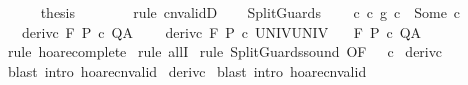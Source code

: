 \begin{isabellebody}
\ \ \ \ \isamarkupfalse%
\ {\isacharquery}thesis\isanewline
\ \ \ \ \ \ \isamarkupfalse%
\ {\isacharparenleft}rule\ cnvalidD{\isacharparenright}\isanewline
\ \ \isamarkupfalse%
\isanewline
{}\isamarkupfalse%
%
\endisatagproof
{\isafoldproof}%
%
\isadelimproof
\isanewline
%
\endisadelimproof
\isanewline
{}\isamarkupfalse%
\ SplitGuards{\isacharcolon}\ \isanewline
\ \ \ c{\isacharcolon}\ {\isachardoublequoteopen}{\isacharparenleft}c\ {\isasyminter}\isactrlsub g\ c\ {\isacharequal}\ Some\ c{\isachardoublequoteclose}\ \isanewline
\ \ \ deriv{\isacharunderscore}c{}{\isacharcolon}\ {\isachardoublequoteopen}{\isasymGamma}{\isacharcomma}{\isasymTheta}{\isasymturnstile}\isactrlbsub {\isacharslash}F\isactrlesub \ P\ c\ Q{\isacharcomma}A{\isachardoublequoteclose}\ \isanewline
\ \ \ deriv{\isacharunderscore}c{}{\isacharcolon}\ {\isachardoublequoteopen}{\isasymGamma}{\isacharcomma}{\isasymTheta}{\isasymturnstile}\isactrlbsub {\isacharslash}F\isactrlesub \ P\ c\ UNIV{\isacharcomma}UNIV{\isachardoublequoteclose}\isanewline
\ \ \ {\isachardoublequoteopen}{\isasymGamma}{\isacharcomma}{\isasymTheta}{\isasymturnstile}\isactrlbsub {\isacharslash}F\isactrlesub \ P\ c\ Q{\isacharcomma}A{\isachardoublequoteclose}\isanewline
%
\isadelimproof
%
\endisadelimproof
%
\isatagproof
{}\isamarkupfalse%
\ {\isacharparenleft}rule\ hoare{\isacharunderscore}complete{\isacharprime}{\isacharparenright}\isanewline
{}\isamarkupfalse%
\ {\isacharparenleft}rule\ allI{\isacharparenright}\isanewline
{}\isamarkupfalse%
\ {\isacharparenleft}rule\ SplitGuards{\isacharunderscore}sound\ {\isacharbrackleft}OF\ {\isacharunderscore}\ {\isacharunderscore}\ c{\isacharbrackright}{\isacharparenright}\isanewline
{}\isamarkupfalse%
\ deriv{\isacharunderscore}c{}\isanewline
{}\isamarkupfalse%
\ {\isacharparenleft}blast\ intro{\isacharcolon}\ hoare{\isacharunderscore}cnvalid{\isacharparenright}\isanewline
{}\isamarkupfalse%
\ deriv{\isacharunderscore}c{}\isanewline
{}\isamarkupfalse%
\ {\isacharparenleft}blast\ intro{\isacharcolon}\ hoare{\isacharunderscore}cnvalid{\isacharparenright}\isanewline
{}\isamarkupfalse%
%
\endisatagproof
{\isafoldproof}%
%
\isadelimproof
\isanewline

\end{isabellebody}
